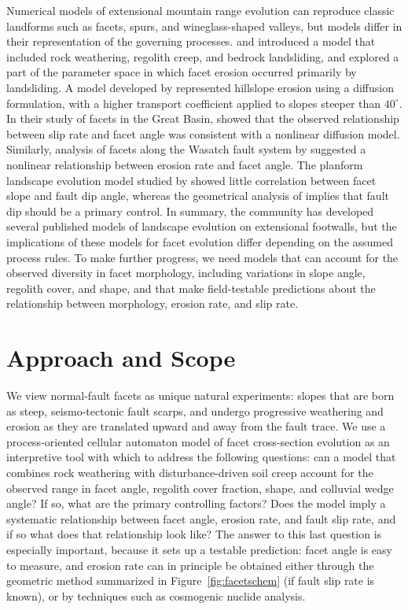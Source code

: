 Numerical models of extensional mountain range evolution can reproduce classic landforms such as facets, spurs, and wineglass-shaped valleys, but models differ in their representation of the governing processes. \citet{densmore1998landsliding} and \citet{ellis1999development} introduced a model that included rock weathering, regolith creep, and bedrock landsliding, and explored a part of the parameter space in which facet erosion occurred primarily by landsliding. A model developed by \citet{petit2009faceted} represented hillslope erosion using a diffusion formulation, with a higher transport coefficient applied to slopes steeper than $40^\circ$. In their study of facets in the Great Basin, \citet{depolo2000estimating} showed that the observed relationship between slip rate and facet angle was consistent with a nonlinear diffusion model. Similarly, analysis of facets along the Wasatch fault system by \citet{struble2019mountain} suggested a nonlinear relationship between erosion rate and facet angle. The planform landscape evolution model studied by \citet{petit2009faceted} showed little correlation between facet slope and fault dip angle, whereas the geometrical analysis of \citet{tucker2011geomorphic} implies that fault dip should be a primary control. In summary, the community has developed several published models of landscape evolution on extensional footwalls, but the implications of these models for facet evolution differ depending on the assumed process rules. To make further progress, we need models that can account for the observed diversity in facet morphology, including variations in slope angle, regolith cover, and shape, and that make field-testable predictions about the relationship between morphology, erosion rate, and slip rate.


\section{Approach and Scope}

We view normal-fault facets as unique natural experiments: slopes that are born as steep, seismo-tectonic fault scarps, and undergo progressive weathering and erosion as they are translated upward and away from the fault trace. We use a process-oriented cellular automaton model of facet cross-section evolution as an interpretive tool with which to address the following questions: can a model that combines rock weathering with disturbance-driven soil creep account for the observed range in facet angle, regolith cover fraction, shape, and colluvial wedge angle? If so, what are the primary controlling factors? Does the model imply a systematic relationship between facet angle, erosion rate, and fault slip rate, and if so what does that relationship look like? The answer to this last question is especially important, because it sets up a testable prediction: facet angle is easy to measure, and erosion rate can in principle be obtained either through the geometric method summarized in Figure~\ref{fig:facetschem} (if fault slip rate is known), or by techniques such as cosmogenic nuclide analysis.

